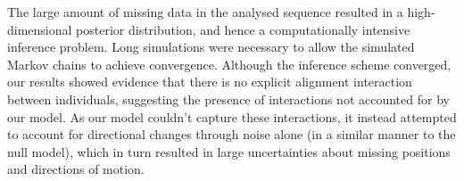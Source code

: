 The large amount of missing data in the analysed sequence resulted in a
high-dimensional posterior distribution, and hence a computationally intensive
inference problem. Long simulations were necessary to allow the simulated
Markov chains to achieve convergence. Although the inference scheme converged,
our results showed evidence that there is no explicit alignment interaction
between individuals, suggesting the presence of interactions not accounted for
by our model. As our model couldn't capture these interactions, it instead
attempted to account for directional changes through noise alone (in a similar
manner to the null model), which in turn resulted in large uncertainties about
missing positions and directions of motion.
